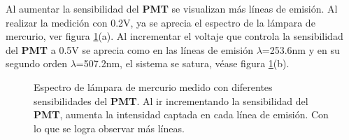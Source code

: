 Al aumentar la sensibilidad del \textbf{PMT} se visualizan más líneas de emisión. Al realizar la medición con 0.2V, ya se aprecia el espectro de la lámpara de mercurio, ver figura \ref{fig:hglamp}(a). Al incrementar el voltaje que controla la sensibilidad del \textbf{PMT} a 0.5V se aprecia como en las líneas de emisión $\lambda$=253.6nm y en su segundo orden $\lambda$=507.2nm, el sistema se satura, véase figura \ref{fig:hglamp}(b).
\begin{figure}[h!]
	\caption[Espectro de lámpara de mercurio medido con diferentes sensibilidades del \textbf{PMT}]{Espectro de lámpara de mercurio medido con diferentes sensibilidades del \textbf{PMT}. Al ir incrementando la sensibilidad del \textbf{PMT}, aumenta la intensidad captada en cada línea de emisión. Con lo que se logra observar más líneas.}
	\label{fig:hglamp}
\end{figure}
\newpage

